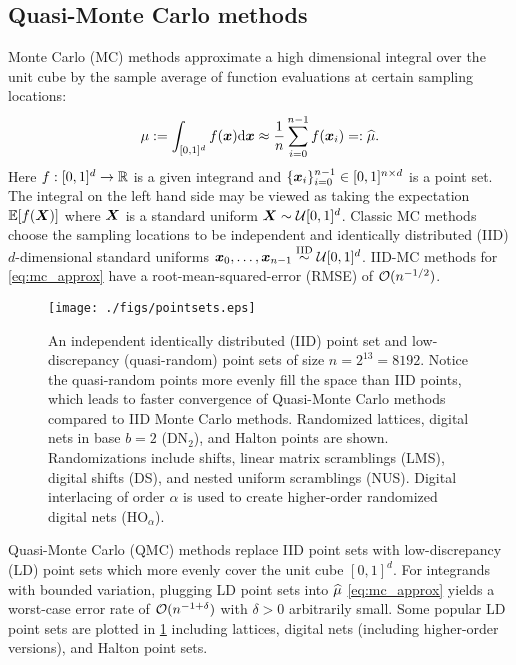 \documentclass[acmsmall]{acmart}
\begin{document}
\subsection{Quasi-Monte Carlo methods}

Monte Carlo (MC) methods approximate a high dimensional integral over the unit cube by the sample average of function evaluations at certain sampling locations:
\begin{equation}
    \mu := \int_{[0,1]^d} f({\boldsymbol{x}}) \mathrm{d} {\boldsymbol{x}} \approx \frac{1}{n} \sum_{i=0}^{n-1} f({\boldsymbol{x}}_i) =: {\widehat{\mu}}.
    \label{eq:mc_approx}
\end{equation}
Here $f: [0,1]^d \to {\mathbb{R}}$ is a given integrand and $\{{\boldsymbol{x}}_i\}_{i=0}^{n-1} \in [0,1]^{n \times d}$ is a point set. The integral on the left hand side may be viewed as taking the expectation ${\mathbb{E}}[f({\boldsymbol{X}})]$ where ${\boldsymbol{X}}$ is a standard uniform ${\boldsymbol{X}} \sim {\mathcal{U}}[0,1]^d$. Classic MC methods choose the sampling locations to be independent and identically distributed (IID) $d$-dimensional standard uniforms ${\boldsymbol{x}}_0,\dots,{\boldsymbol{x}}_{n-1} \overset{\mathrm{IID}}{\sim} {\mathcal{U}}[0,1]^d$. IID-MC methods for \eqref{eq:mc_approx} have a root-mean-squared-error (RMSE) of ${\mathcal{O}}(n^{-1/2})$.

\begin{figure}%
    \centering
    \texttt{[image: ./figs/pointsets.eps]}
    \caption{An independent identically distributed (IID) point set and low-discrepancy (quasi-random) point sets of size $n=2^{13}=8192$. Notice the quasi-random points more evenly fill the space than IID points, which leads to faster convergence of Quasi-Monte Carlo methods compared to IID Monte Carlo methods. Randomized lattices, digital nets in base $b=2$ (DN${}_{2}$), and Halton points are shown. Randomizations include shifts, linear matrix scramblings (LMS), digital shifts (DS), and nested uniform scramblings (NUS). Digital interlacing of order $\alpha$ is used to create higher-order randomized digital nets (HO${}_\alpha$).}
    \Description[]{}
    \label{fig:point sets}
\end{figure}

Quasi-Monte Carlo (QMC) methods \citep{niederreiter.qmc_book,dick.digital_nets_sequences_book,kroese.handbook_mc_methods,dick2022lattice,lemieux2009monte,sloan1994lattice} replace IID point sets with low-discrepancy (LD) point sets which more evenly cover the unit cube $[0,1]^d$. For integrands with bounded variation, plugging LD point sets into ${\widehat{\mu}}$ \eqref{eq:mc_approx} yields a worst-case error rate of ${\mathcal{O}}(n^{-1+\delta})$ with $\delta>0$ arbitrarily small. Some popular LD point sets are plotted in \cref{fig:point sets} including lattices, digital nets (including higher-order versions), and Halton point sets.
\end{document}
